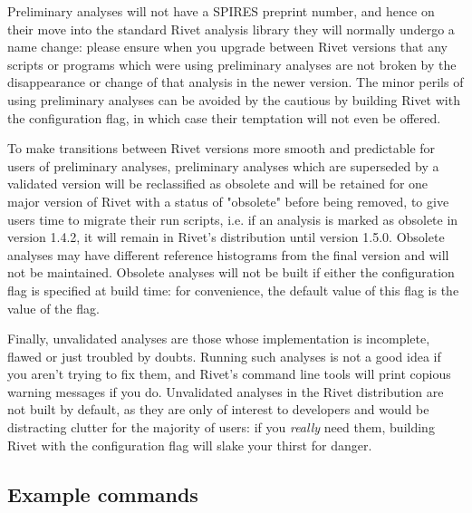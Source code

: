 \documentclass{JHEP3}
\begin{document}
Preliminary analyses will not have a SPIRES preprint number, and hence on their
move into the standard Rivet analysis library they will normally undergo a name
change: please ensure when you upgrade between Rivet versions that any scripts
or programs which were using preliminary analyses are not broken by the
disappearance or change of that analysis in the newer version. The minor perils
of using preliminary analyses can be avoided by the cautious by building Rivet
with the  configuration flag, in which case their
temptation will not even be offered.

To make transitions between Rivet versions more smooth and predictable for users
of preliminary analyses, preliminary analyses which are superseded by a
validated version will be reclassified as obsolete and will be retained for one
major version of Rivet with a status of "obsolete" before being removed, to give
users time to migrate their run scripts, i.e. if an analysis is marked as
obsolete in version 1.4.2, it will remain in Rivet's distribution until version
1.5.0.  Obsolete analyses may have different reference histograms from the final
version and will not be maintained. Obsolete analyses will not be built if
either the  configuration flag is specified at build
time: for convenience, the default value of this flag is the value of the
 flag.

Finally, unvalidated analyses are those whose implementation is incomplete,
flawed or just troubled by doubts. Running such analyses is not a good idea if
you aren't trying to fix them, and Rivet's command line tools will print copious
warning messages if you do. Unvalidated analyses in the Rivet distribution are
not built by default, as they are only of interest to developers and would be
distracting clutter for the majority of users: if you \emph{really} need them,
building Rivet with the  configuration flag will
slake your thirst for danger.


\subsection{Example  commands}
\end{document}
